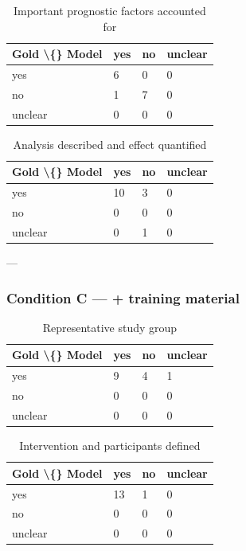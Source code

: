 \documentclass[11pt,a4paper]{article}
\begin{document}
\begin{table}[H]
\centering
\caption{Important prognostic factors accounted for}
\label{tab:supp_7}
\begin{tabular}{llll}
\toprule
Gold \textbackslash\{\} Model & yes & no & unclear \\
\midrule
yes & 6 & 0 & 0 \\
no & 1 & 7 & 0 \\
unclear & 0 & 0 & 0 \\
\bottomrule
\end{tabular}
\end{table}

\begin{table}[H]
\centering
\caption{Analysis described and effect quantified}
\label{tab:supp_8}
\begin{tabular}{llll}
\toprule
Gold \textbackslash\{\} Model & yes & no & unclear \\
\midrule
yes & 10 & 3 & 0 \\
no & 0 & 0 & 0 \\
unclear & 0 & 1 & 0 \\
\bottomrule
\end{tabular}
\end{table}

---

\subsubsection{Condition C — + training material}

\begin{table}[H]
\centering
\caption{Representative study group}
\label{tab:supp_9}
\begin{tabular}{llll}
\toprule
Gold \textbackslash\{\} Model & yes & no & unclear \\
\midrule
yes & 9 & 4 & 1 \\
no & 0 & 0 & 0 \\
unclear & 0 & 0 & 0 \\
\bottomrule
\end{tabular}
\end{table}

\begin{table}[H]
\centering
\caption{Intervention and participants defined}
\label{tab:supp_10}
\begin{tabular}{llll}
\toprule
Gold \textbackslash\{\} Model & yes & no & unclear \\
\midrule
yes & 13 & 1 & 0 \\
no & 0 & 0 & 0 \\
unclear & 0 & 0 & 0 \\
\bottomrule
\end{tabular}
\end{table}
\end{document}
